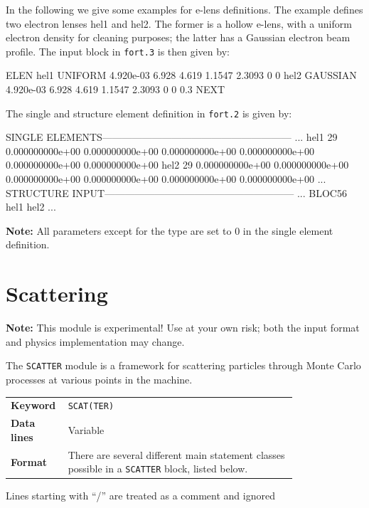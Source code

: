 In the following we give some examples for e-lens definitions.
The example defines two electron lenses hel1 and hel2.
The former is a hollow e-lens, with a uniform electron density for cleaning purposes; the latter has a Gaussian electron beam profile.
The input block in \texttt{fort.3} is then given by:
\begin{cverbatim}
ELEN
hel1 UNIFORM 4.920e-03 6.928 4.619 1.1547 2.3093 0 0
hel2 GAUSSIAN 4.920e-03 6.928 4.619 1.1547 2.3093 0 0 0.3
NEXT
\end{cverbatim}
The single and structure element definition in \texttt{fort.2} is given by:
\begin{ctverbatim}
SINGLE ELEMENTS---------------------------------------------------------
...
hel1            29  0.000000000e+00  0.000000000e+00  0.000000000e+00  0.000000000e+00  0.000000000e+00  0.000000000e+00
hel2            29  0.000000000e+00  0.000000000e+00  0.000000000e+00  0.000000000e+00  0.000000000e+00  0.000000000e+00
...
STRUCTURE INPUT---------------------------------------------------------
...
BLOC56            hel1              hel2
...
\end{ctverbatim}

\bigskip
\noindent \textbf{Note:} All parameters except for the type are set to 0 in the single element definition.

\section{Scattering} \label{sec:scatter}

\textcolor{notered}{\textbf{Note:} This module is experimental! Use at your own risk; both the input format and physics implementation may change.}

\bigskip
The \texttt{SCATTER} module is a framework for scattering particles through Monte Carlo processes at various points in the machine.

\bigskip
\begin{tabular}{@{}lp{0.8\linewidth}}
    \textbf{Keyword}    & \texttt{SCAT(TER)} \\
    \textbf{Data lines} & Variable \\
    \textbf{Format}     & There are several different main statement classes possible in a \texttt{SCATTER} block, listed below.
\end{tabular}

\bigskip
\noindent Lines starting with ``/'' are treated as a comment and ignored

